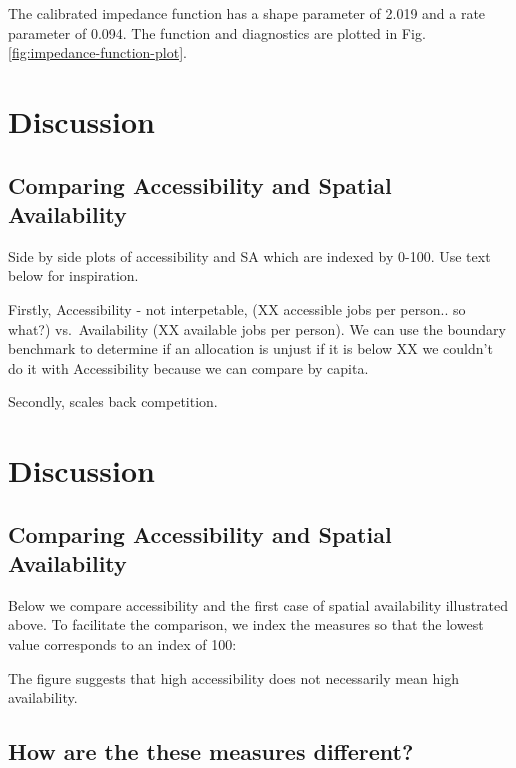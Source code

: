 \documentclass[]{elsarticle} %
\begin{document}
The calibrated impedance function has a shape parameter of 2.019 and a
rate parameter of 0.094. The function and diagnostics are plotted in
Fig. \ref{fig:impedance-function-plot}.

\hypertarget{discussion}{%
\section{Discussion}\label{discussion}}

\hypertarget{comparing-accessibility-and-spatial-availability}{%
\subsection{Comparing Accessibility and Spatial
Availability}\label{comparing-accessibility-and-spatial-availability}}

Side by side plots of accessibility and SA which are indexed by 0-100.
Use text below for inspiration.

Firstly, Accessibility - not interpetable, (XX accessible jobs per
person.. so what?) vs.~Availability (XX available jobs per person). We
can use the boundary benchmark to determine if an allocation is unjust
if it is below XX we couldn't do it with Accessibility because we can
compare by capita.

Secondly, scales back competition.

\hypertarget{discussion-1}{%
\section{Discussion}\label{discussion-1}}

\hypertarget{comparing-accessibility-and-spatial-availability-1}{%
\subsection{Comparing Accessibility and Spatial
Availability}\label{comparing-accessibility-and-spatial-availability-1}}

Below we compare accessibility and the first case of spatial
availability illustrated above. To facilitate the comparison, we index
the measures so that the lowest value corresponds to an index of 100:

The figure suggests that high accessibility does not necessarily mean
high availability.

\hypertarget{how-are-the-these-measures-different}{%
\subsection{How are the these measures
different?}\label{how-are-the-these-measures-different}}
\end{document}
